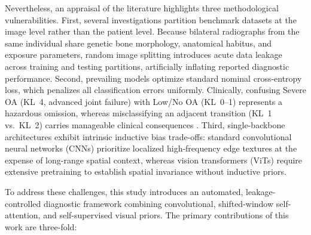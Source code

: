 \documentclass[10pt,journal]{IEEEtran}
\begin{document}
Nevertheless, an appraisal of the literature highlights three methodological vulnerabilities. First, several investigations partition benchmark datasets at the image level rather than the patient level. Because bilateral radiographs from the same individual share genetic bone morphology, anatomical habitus, and exposure parameters, random image splitting introduces acute data leakage across training and testing partitions, artificially inflating reported diagnostic performance. Second, prevailing models optimize standard nominal cross-entropy loss, which penalizes all classification errors uniformly. Clinically, confusing Severe OA (KL~4, advanced joint failure) with Low/No OA (KL~0--1) represents a hazardous omission, whereas misclassifying an adjacent transition (KL~1 vs.\ KL~2) carries manageable clinical consequences \cite{antony2016quantifying}. Third, single-backbone architectures exhibit intrinsic inductive bias trade-offs: standard convolutional neural networks (CNNs) prioritize localized high-frequency edge textures at the expense of long-range spatial context, whereas vision transformers (ViTs) require extensive pretraining to establish spatial invariance without inductive priors.

To address these challenges, this study introduces an automated, leakage-controlled diagnostic framework combining convolutional, shifted-window self-attention, and self-supervised visual priors. The primary contributions of this work are three-fold:
\end{document}
